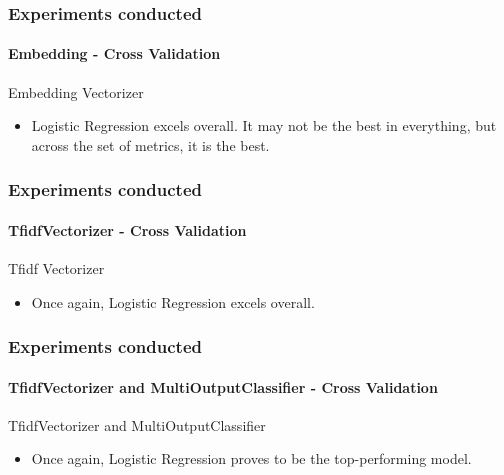 \begin{frame}
	\frametitle{Experiments conducted}
	\framesubtitle{Embedding - Cross Validation}


	\begin{exampleblock}{Embedding Vectorizer} 
		\begin{itemize}
			\item Logistic Regression excels overall. It may not be the best in everything, but across the set of metrics, it is the best.
		\end{itemize}
	\end{exampleblock}

	
	\begin{table}
		\centering
		\resizebox{1\textwidth}{!}{
			
		}
		\caption{Embedding - Cross Validation}
	\end{table}


\end{frame}
\begin{frame}
	\frametitle{Experiments conducted}
	\framesubtitle{TfidfVectorizer - Cross Validation}

	\begin{exampleblock}{Tfidf Vectorizer} 
		\begin{itemize}
			\item Once again, Logistic Regression excels overall.
		\end{itemize}
	\end{exampleblock}

	
	\begin{table}
		\centering
		\resizebox{1\textwidth}{!}{
			
		}
		\caption{TfidfVectorizer - Cross Validation}
	\end{table}


\end{frame}
\begin{frame}
	\frametitle{Experiments conducted}
	\framesubtitle{TfidfVectorizer and MultiOutputClassifier - Cross Validation}

	\begin{exampleblock}{TfidfVectorizer and MultiOutputClassifier} 
		\begin{itemize}
			\item Once again, Logistic Regression proves to be the top-performing model.
		\end{itemize}
	\end{exampleblock}
	
	\begin{table}
		\centering
		\resizebox{1\textwidth}{!}{
			
		}
		\caption{TfidfVectorizer and MultiOutputClassifier - Cross Validation}
	\end{table}

\end{frame}
